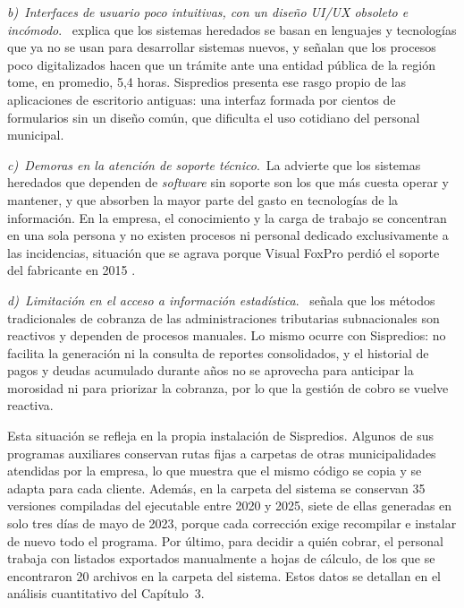 \documentclass[12pt,a4paper]{report}
\newcommand{\causa}[2]{\par\textit{#1)~#2}.\ }
\begin{document}
\causa{b}{Interfaces de usuario poco intuitivas, con un diseño UI/UX obsoleto e incómodo}\textcite{sommerville2011} explica que los sistemas heredados se basan en lenguajes y tecnologías que ya no se usan para desarrollar sistemas nuevos, y \textcite{bid2018} señalan que los procesos poco digitalizados hacen que un trámite ante una entidad pública de la región tome, en promedio, 5,4 horas. Sispredios presenta ese rasgo propio de las aplicaciones de escritorio antiguas: una interfaz formada por cientos de formularios sin un diseño común, que dificulta el uso cotidiano del personal municipal.

\causa{c}{Demoras en la atención de soporte técnico}La \textcite{gao2025} advierte que los sistemas heredados que dependen de \textit{software} sin soporte son los que más cuesta operar y mantener, y que absorben la mayor parte del gasto en tecnologías de la información. En la empresa, el conocimiento y la carga de trabajo se concentran en una sola persona y no existen procesos ni personal dedicado exclusivamente a las incidencias, situación que se agrava porque Visual FoxPro perdió el soporte del fabricante en 2015 \parencite{taft2007}.

\causa{d}{Limitación en el acceso a información estadística}\textcite{benedetto2026} señala que los métodos tradicionales de cobranza de las administraciones tributarias subnacionales son reactivos y dependen de procesos manuales. Lo mismo ocurre con Sispredios: no facilita la generación ni la consulta de reportes consolidados, y el historial de pagos y deudas acumulado durante años no se aprovecha para anticipar la morosidad ni para priorizar la cobranza, por lo que la gestión de cobro se vuelve reactiva. %

Esta situación se refleja en la propia instalación de Sispredios. Algunos de sus programas auxiliares conservan rutas fijas a carpetas de otras municipalidades atendidas por la empresa, lo que muestra que el mismo código se copia y se adapta para cada cliente. Además, en la carpeta del sistema se conservan 35 versiones compiladas del ejecutable entre 2020 y 2025, siete de ellas generadas en solo tres días de mayo de 2023, porque cada corrección exige recompilar e instalar de nuevo todo el programa. Por último, para decidir a quién cobrar, el personal trabaja con listados exportados manualmente a hojas de cálculo, de los que se encontraron 20 archivos en la carpeta del sistema. Estos datos se detallan en el análisis cuantitativo del Capítulo~3.
\end{document}
